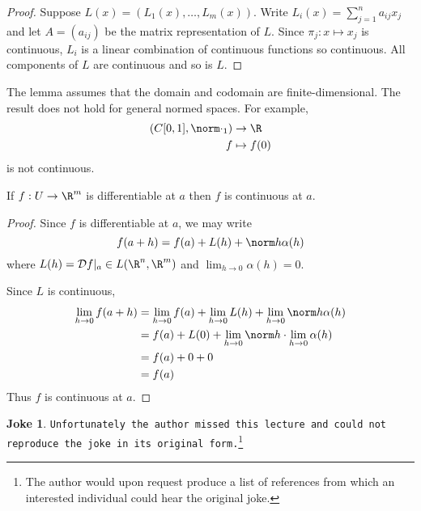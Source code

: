 \documentclass[a4paper]{article}
\newcommand*{\D}{\mathcal{D}}
\theoremstyle{definition}
\newtheorem*{joke}{Joke}
\begin{document}
\begin{proof}
  Suppose \(L(x) = (L_1(x), \dots, L_m(x))\). Write \(L_i(x) = \sum_{j = 1}^{n} a_{ij} x_j\) and let \(A = (a_{ij})\) be the matrix representation of \(L\). Since \(\pi_j: x \mapsto x_j\) is continuous, \(L_i\) is a linear combination of continuous functions so continuous. All components of \(L\) are continuous and so is \(L\).
\end{proof}

\begin{note}
  The lemma assumes that the domain and codomain are finite-dimensional. The result does not hold for general normed spaces. For example,
  \begin{align*}
    (C[0, 1], \norm \cdot_1) &\to \R \\
    f &\mapsto f(0)
  \end{align*}
  is not continuous.
\end{note}

\begin{proposition}
  If \(f: U \to \R^m\) is differentiable at \(a\) then \(f\) is continuous at \(a\).
\end{proposition}

\begin{proof}
  Since \(f\) is differentiable at \(a\), we may write
  \[
    f(a + h) = f(a) + L(h) + \norm h \alpha(h)
  \]
  where \(L(h) = \D f|_a \in L(\R^n, \R^m)\) and \(\lim_{h \to 0} \alpha(h) = 0\).

  Since \(L\) is continuous,
  \begin{align*}
    \lim_{h \to 0} f(a + h) &= \lim_{h \to 0} f(a) + \lim_{h \to 0} L(h)  + \lim_{h \to 0} \norm h \alpha(h) \\
                            &= f(a) + L(0) + \lim_{h \to 0}\norm h \cdot \lim_{h \to 0} \alpha(h) \\
                            &= f(a) + 0 + 0 \\
                            &= f(a)
  \end{align*}
  Thus \(f\) is continuous at \(a\).
\end{proof}

\begin{joke}
  {\raggedright
    \texttt{Unfortunately the author missed this lecture and could not reproduce the joke in its original form.}\footnote{The author would upon request produce a list of references from which an interested individual could hear the original joke.}
  \par}
\end{joke}
\end{document}
